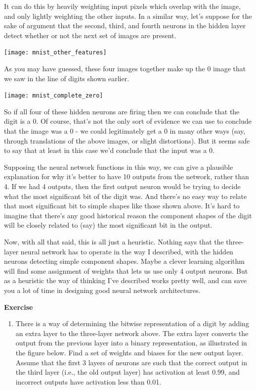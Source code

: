 It can do this by heavily weighting input pixels which overlap with the image, and only lightly weighting the other inputs. In a similar way, let's suppose for the sake of argument that the second, third, and fourth neurons in the hidden layer detect whether or not the next set of images are present.


\begin{marginfigure}
\texttt{[image: mnist\_other\_features]}
\end{marginfigure}

As you may have guessed, these four images together make up the 0 image that we saw in the line of digits shown earlier.

\begin{marginfigure}
\texttt{[image: mnist\_complete\_zero]}
\end{marginfigure}

So if all four of these hidden neurons are firing then we can conclude that the digit is a 0. Of course, that's not the only sort of evidence we can use to conclude that the image was a 0 - we could legitimately get a 0 in many other ways (say, through translations of the above images, or slight distortions). But it seems safe to say that at least in this case we'd conclude that the input was a 0.

Supposing the neural network functions in this way, we can give a plausible explanation for why it's better to have 10 outputs from the network, rather than 4. If we had 4 outputs, then the first output neuron would be trying to decide what the most significant bit of the digit was. And there's no easy way to relate that most significant bit to simple shapes like those shown above. It's hard to imagine that there's any good historical reason the component shapes of the digit will be closely related to (say) the most significant bit in the output.

Now, with all that said, this is all just a heuristic. Nothing says that the three-layer neural network has to operate in the way I described, with the hidden neurons detecting simple component shapes. Maybe a clever learning algorithm will find some assignment of weights that lets us use only 4 output neurons. But as a heuristic the way of thinking I've described works pretty well, and can save you a lot of time in designing good neural network architectures.

\textbf{Exercise}
\begin{enumerate}
\item 
There is a way of determining the bitwise representation of a digit by adding an extra layer to the three-layer network above. The extra layer converts the output from the previous layer into a binary representation, as illustrated in the figure below. Find a set of weights and biases for the new output layer. Assume that the first 3 layers of neurons are such that the correct output in the third layer (i.e., the old output layer) has activation at least 0.99, and incorrect outputs have activation less than 0.01. 
\end{enumerate}

